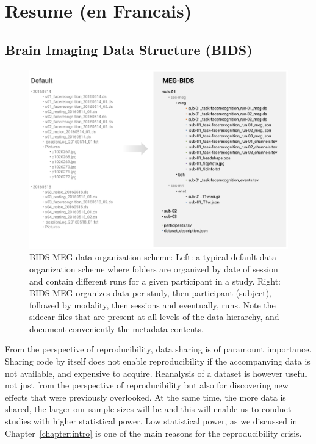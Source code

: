 \chapter{Resume (en Francais)}
\label{chapter:resume}
\pagestyle{mainmatter}

\clearpage
\section{Brain Imaging Data Structure (BIDS)}

\begin{figure}[htb!]
\begin{center}
   \includegraphics[width=\linewidth]{figures/bids_organization.png}
\end{center}
   \caption[BIDS-MEG data organization scheme.]{BIDS-MEG data organization scheme: Left: a typical default data organization scheme where folders are organized by date of session and contain different runs for a given participant in a study. Right: BIDS-MEG organizes data per study, then participant (subject), followed by modality, then sessions and eventually, runs. Note the sidecar files that are present at all levels of the data hierarchy, and document conveniently the metadata contents.}
   \label{fig:BIDS-MEG-organization}
\end{figure}
From the perspective of reproducibility, data sharing is of paramount importance. Sharing code by itself does not enable reproducibility if the accompanying data is not available, and expensive to acquire. Reanalysis of a dataset is however useful not just from the perspective of reproducibility but also for discovering new effects that were previously overlooked. At the same time, the more data is shared, the larger our sample sizes will be and this will enable us to conduct studies with higher statistical power. Low statistical power, as we discussed in Chapter~\ref{chapter:intro} is one of the main reasons for the reproducibility crisis.

